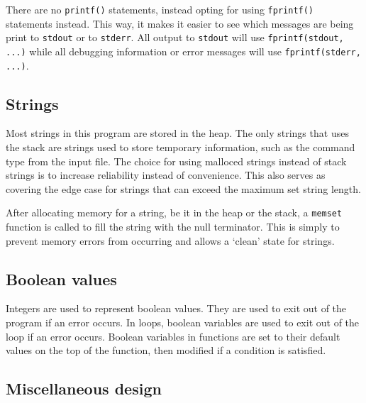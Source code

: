 \documentclass[a4paper, 12pt, titlepage]{article}
\newcommand{\code}[1]{\small\texttt{#1}\normalsize}
\begin{document}
There are no \code{printf()} statements, instead opting for using
\code{fprintf()} statements instead. This way, it makes it easier to
see which messages are being print to \code{stdout} or to \code{stderr}. All
output to \code{stdout} will use \code{fprintf(stdout, ...)} while all
debugging information or error messages will use \code{fprintf(stderr, ...)}.

\subsection{Strings}

Most strings in this program are stored in the heap. The only strings
that uses the stack are strings used to store temporary information,
such as the command type from the input file. The choice for using
malloced strings instead of stack strings is to increase reliability
instead of convenience. This also serves as covering the edge case
for strings that can exceed the maximum set string length.

After allocating memory for a string, be it in the heap or the stack,
a \code{memset} function is called to fill the string with the null
terminator. This is simply to prevent memory errors from occurring and
allows a `clean' state for strings.

\pagebreak
\subsection{Boolean values}

Integers are used to represent boolean values. They are used to exit
out of the program if an error occurs. In loops, boolean variables are
used to exit out of the loop if an error occurs. Boolean variables in
functions are set to their default values on the top of the function, then
modified if a condition is satisfied.

\subsection{Miscellaneous design}
\end{document}
